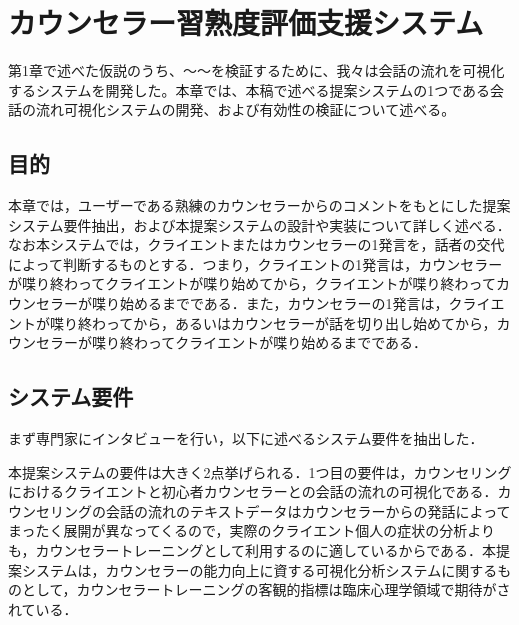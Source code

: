 \documentclass[shuuron]{kuee}
\begin{document}
\chapter{カウンセラー習熟度評価支援システム}





第1章で述べた仮説のうち、〜〜を検証するために、我々は会話の流れを可視化するシステムを開発した。本章では、本稿で述べる提案システムの1つである会話の流れ可視化システムの開発、および有効性の検証について述べる。
\section{目的}

本章では，ユーザーである熟練のカウンセラーからのコメントをもとにした提案システム要件抽出，および本提案システムの設計や実装について詳しく述べる．なお本システムでは，クライエントまたはカウンセラーの1発言を，話者の交代によって判断するものとする．つまり，クライエントの1発言は，カウンセラーが喋り終わってクライエントが喋り始めてから，クライエントが喋り終わってカウンセラーが喋り始めるまでである．また，カウンセラーの1発言は，クライエントが喋り終わってから，あるいはカウンセラーが話を切り出し始めてから，カウンセラーが喋り終わってクライエントが喋り始めるまでである．








\section{システム要件}




まず専門家にインタビューを行い，以下に述べるシステム要件を抽出した．




本提案システムの要件は大きく2点挙げられる．1つ目の要件は，カウンセリングにおけるクライエントと初心者カウンセラーとの会話の流れの可視化である．カウンセリングの会話の流れのテキストデータはカウンセラーからの発話によってまったく展開が異なってくるので，実際のクライエント個人の症状の分析よりも，カウンセラートレーニングとして利用するのに適しているからである．本提案システムは，カウンセラーの能力向上に資する可視化分析システムに関するものとして，カウンセラートレーニングの客観的指標は臨床心理学領域で期待がされている．
\end{document}
